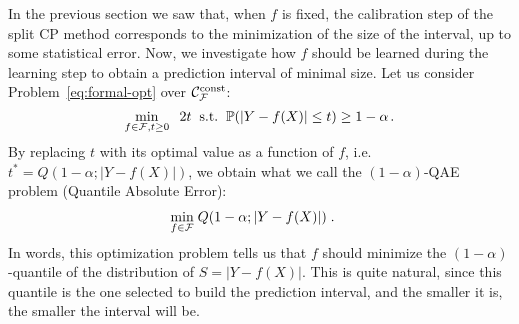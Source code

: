 In the previous section we saw that, when $f$ is fixed, the calibration step of the split CP method corresponds to the minimization of the size of the interval, up to some statistical error. Now, we investigate how $f$ should be learned during the learning step to obtain a prediction interval of minimal size. Let us consider Problem~\eqref{eq:formal-opt} over ${\cal C}^{\text{const}}_{\mathcal{F}}$:
%
%
%
\begin{equation}
\min_{f\in\mathcal{F}, t \geq 0} \hspace{0.2cm}  2t  \hspace{0.2cm}\text{s.t.}\hspace{0.2cm}  {\mathbb{P}}(|Y-f(X)|\leq t) \geq 1-\alpha\hspace{0.05cm}.
\end{equation}
By replacing $t$ with its optimal value as a function of $f$, i.e. $t^*=Q(1-\alpha ; |Y-f(X)|)$, we obtain what we call the $(1-\alpha)$-QAE problem (Quantile Absolute Error):
%
\begin{align}\label{eq:QAE}
\min_{f\in\mathcal{F}} &\; Q(1-\alpha ; |Y-f(X)|)\;.
\end{align}
%
In words, this optimization problem tells us that $f$ should minimize the $(1-\alpha)$-quantile of the distribution of $S = |Y-f(X)|$. This is quite natural, since this quantile is the one selected to build the prediction interval, and the smaller it is, the smaller the interval will be.


